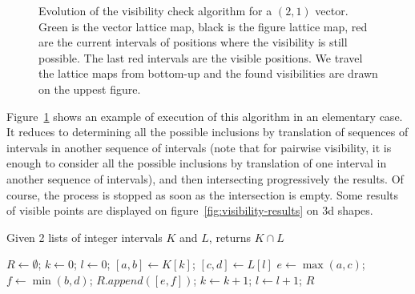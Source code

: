 \begin{figure}
  \centering
  
  \caption{Evolution of the visibility check algorithm for a $(2,1)$
    vector. Green is the vector lattice map, black is the figure
    lattice map, red are the current intervals of positions where
    the visibility is still possible. The last red intervals are
    the visible positions. We travel the lattice maps from
    bottom-up and the found visibilities are drawn on the
    uppest figure.}
  \label{fig:visibility-algorithm-evolution}
\end{figure}

Figure~\ref{fig:visibility-algorithm-evolution} shows an example of
execution of this algorithm in an elementary case. It reduces to
determining all the possible inclusions by translation of sequences of
intervals in another sequence of intervals (note that for
pairwise visibility, it is enough to consider all the possible
inclusions by translation of one interval in another sequence of
intervals), and then intersecting progressively the results. Of
course, the process is stopped as soon as the intersection is
empty. Some results of visible points are displayed on
figure~\ref{fig:visibility-results} on 3d shapes.


\begin{algorithm}
  \caption{Given 2 lists of integer intervals $K$ and $L$, returns $K \cap L$}
  \label{alg:intersection}
  \begin{algorithmic}
    \State $R \gets \emptyset$; $k \gets 0$; $l \gets 0$;
    \State $[a,b] \gets K[k]$; $[c,d] \gets L[l]$
    \State $e \gets \max(a, c)$; $f \gets \min(b, d)$;
    $R.append([e, f])$;
    \EndIf
    $k \gets k+1$;
    \EndIf
    $l \gets l+1$;
    \EndIf
    \EndWhile
    \State \Return $R$
    \EndFunction
  \end{algorithmic}
\end{algorithm}

